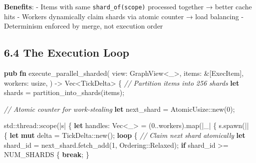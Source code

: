 \documentclass[
]{book}
\newenvironment{Shaded}{}{}
\newcommand{\CommentTok}[1]{\textcolor[rgb]{0.38,0.63,0.69}{\textit{#1}}}
\newcommand{\ControlFlowTok}[1]{\textcolor[rgb]{0.00,0.44,0.13}{\textbf{#1}}}
\newcommand{\DataTypeTok}[1]{\textcolor[rgb]{0.56,0.13,0.00}{#1}}
\newcommand{\DecValTok}[1]{\textcolor[rgb]{0.25,0.63,0.44}{#1}}
\newcommand{\KeywordTok}[1]{\textcolor[rgb]{0.00,0.44,0.13}{\textbf{#1}}}
\newcommand{\NormalTok}[1]{#1}
\newcommand{\OperatorTok}[1]{\textcolor[rgb]{0.40,0.40,0.40}{#1}}
\newcommand{\OtherTok}[1]{\textcolor[rgb]{0.00,0.44,0.13}{#1}}
\newcommand{\PreprocessorTok}[1]{\textcolor[rgb]{0.74,0.48,0.00}{#1}}
\begin{document}
\textbf{Benefits}: - Items with same \texttt{shard\_of(scope)} processed
together → better cache hits - Workers dynamically claim shards via
atomic counter → load balancing - Determinism enforced by merge, not
execution order

\subsection{6.4 The Execution Loop}\label{the-execution-loop}

\begin{Shaded}
\begin{Highlighting}[]
\KeywordTok{pub} \KeywordTok{fn}\NormalTok{ execute\_parallel\_sharded(}
\NormalTok{    view}\OperatorTok{:}\NormalTok{ GraphView}\OperatorTok{\textless{}}\OtherTok{\textquotesingle{}\_}\OperatorTok{\textgreater{},}
\NormalTok{    items}\OperatorTok{:} \OperatorTok{\&}\NormalTok{[ExecItem]}\OperatorTok{,}
\NormalTok{    workers}\OperatorTok{:} \DataTypeTok{usize}\OperatorTok{,}
\NormalTok{) }\OperatorTok{{-}\textgreater{}} \DataTypeTok{Vec}\OperatorTok{\textless{}}\NormalTok{TickDelta}\OperatorTok{\textgreater{}} \OperatorTok{\{}
    \CommentTok{// Partition items into 256 shards}
    \KeywordTok{let}\NormalTok{ shards }\OperatorTok{=}\NormalTok{ partition\_into\_shards(items)}\OperatorTok{;}

    \CommentTok{// Atomic counter for work{-}stealing}
    \KeywordTok{let}\NormalTok{ next\_shard }\OperatorTok{=} \PreprocessorTok{AtomicUsize::}\NormalTok{new(}\DecValTok{0}\NormalTok{)}\OperatorTok{;}

    \PreprocessorTok{std::thread::}\NormalTok{scope(}\OperatorTok{|}\NormalTok{s}\OperatorTok{|} \OperatorTok{\{}
        \KeywordTok{let}\NormalTok{ handles}\OperatorTok{:} \DataTypeTok{Vec}\OperatorTok{\textless{}}\NormalTok{\_}\OperatorTok{\textgreater{}} \OperatorTok{=}\NormalTok{ (}\DecValTok{0}\OperatorTok{..}\NormalTok{workers)}\OperatorTok{.}\NormalTok{map(}\OperatorTok{|}\NormalTok{\_}\OperatorTok{|} \OperatorTok{\{}
\NormalTok{            s}\OperatorTok{.}\NormalTok{spawn(}\OperatorTok{||} \OperatorTok{\{}
                \KeywordTok{let} \KeywordTok{mut}\NormalTok{ delta }\OperatorTok{=} \PreprocessorTok{TickDelta::}\NormalTok{new()}\OperatorTok{;}
                \ControlFlowTok{loop} \OperatorTok{\{}
                    \CommentTok{// Claim next shard atomically}
                    \KeywordTok{let}\NormalTok{ shard\_id }\OperatorTok{=}\NormalTok{ next\_shard}\OperatorTok{.}\NormalTok{fetch\_add(}\DecValTok{1}\OperatorTok{,} \PreprocessorTok{Ordering::}\NormalTok{Relaxed)}\OperatorTok{;}
                    \ControlFlowTok{if}\NormalTok{ shard\_id }\OperatorTok{\textgreater{}=}\NormalTok{ NUM\_SHARDS }\OperatorTok{\{} \ControlFlowTok{break}\OperatorTok{;} \OperatorTok{\}}


\end{Highlighting}
\end{Shaded}
\end{document}

